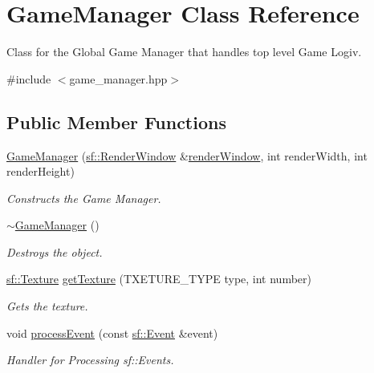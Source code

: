 \hypertarget{class_game_manager}{}\section{Game\+Manager Class Reference}
\label{class_game_manager}


Class for the Global Game Manager that handles top level Game Logiv.  




{\ttfamily \#include $<$game\+\_\+manager.\+hpp$>$}

\subsection*{Public Member Functions}
\begin{DoxyCompactItemize}
\item 
\mbox{\hyperlink{class_game_manager_a6e574e4af055f58460f9ed807755089d}{Game\+Manager}} (\mbox{\hyperlink{classsf_1_1_render_window}{sf\+::\+Render\+Window}} \&\mbox{\hyperlink{class_game_manager_abc49637986351c2b5a77beee02771d53}{render\+Window}}, int render\+Width, int render\+Height)
\begin{DoxyCompactList}\small\item\em Constructs the Game Manager. \end{DoxyCompactList}\item 
\mbox{\label{class_game_manager_aaae63e38e358379c1fe507c5197a8435}} 
\mbox{\hyperlink{class_game_manager_aaae63e38e358379c1fe507c5197a8435}{$\sim$\+Game\+Manager}} ()
\begin{DoxyCompactList}\small\item\em Destroys the object. \end{DoxyCompactList}\item 
\mbox{\hyperlink{classsf_1_1_texture}{sf\+::\+Texture}} \mbox{\hyperlink{class_game_manager_a30f1ae32dd5d52434ea2ec968c117110}{get\+Texture}} (T\+X\+E\+T\+U\+R\+E\+\_\+\+T\+Y\+PE type, int number)
\begin{DoxyCompactList}\small\item\em Gets the texture. \end{DoxyCompactList}\item 
void \mbox{\hyperlink{class_game_manager_a84575ec8a2912f6bba87ca96297c0cd5}{process\+Event}} (const \mbox{\hyperlink{classsf_1_1_event}{sf\+::\+Event}} \&event)
\begin{DoxyCompactList}\small\item\em Handler for Processing sf\+::\+Events. \end{DoxyCompactList}\item 

\end{DoxyCompactItemize}
